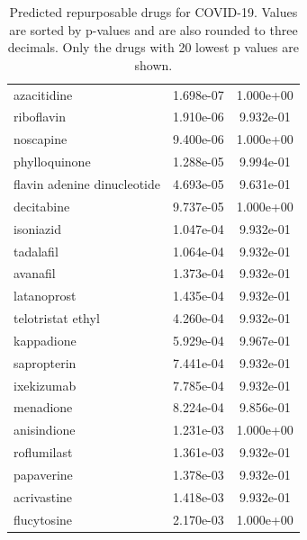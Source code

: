 \begin{table}[H]
\begin{center}
\captionsetup{width=10.5cm}
\caption{Predicted repurposable drugs for COVID-19. Values are sorted by p-values and are also rounded to three decimals. Only the drugs with 20 lowest p values are shown.}
\label{tab:predDrugsCovid}
\begin{tabular}{ l S S }
    \toprule
     &  &  \\
    \midrule
azacitidine     & 1.698e-07 & 1.000e+00             \\
riboflavin      & 1.910e-06 & 9.932e-01             \\
noscapine       & 9.400e-06 & 1.000e+00             \\
phylloquinone   & 1.288e-05 & 9.994e-01             \\
flavin adenine dinucleotide & 4.693e-05 & 9.631e-01 \\
decitabine      & 9.737e-05 & 1.000e+00             \\
isoniazid       & 1.047e-04 & 9.932e-01             \\
tadalafil       & 1.064e-04 & 9.932e-01             \\
avanafil        & 1.373e-04 & 9.932e-01             \\
latanoprost     & 1.435e-04 & 9.932e-01             \\
telotristat ethyl & 4.260e-04 & 9.932e-01           \\
kappadione      & 5.929e-04 & 9.967e-01             \\
sapropterin     & 7.441e-04 & 9.932e-01             \\
ixekizumab      & 7.785e-04 & 9.932e-01             \\
menadione       & 8.224e-04 & 9.856e-01             \\
anisindione     & 1.231e-03 & 1.000e+00             \\
roflumilast     & 1.361e-03 & 9.932e-01             \\
papaverine      & 1.378e-03 & 9.932e-01             \\
acrivastine     & 1.418e-03 & 9.932e-01             \\
flucytosine     & 2.170e-03 & 1.000e+00             \\

\bottomrule
\end{tabular}
\npnoround

\end{center}
\end{table}

